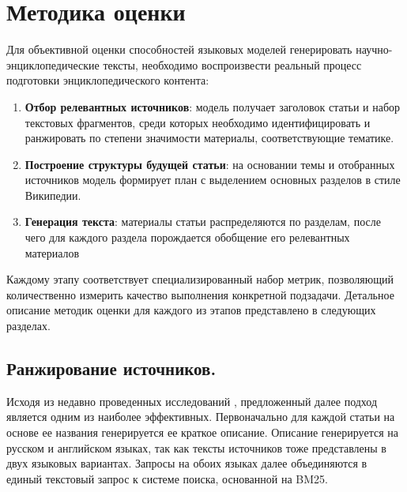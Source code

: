 \documentclass{article}
\theoremstyle{definition}
\theoremstyle{plain}
\begin{document}
\section*{Методика оценки}

Для объективной оценки способностей языковых моделей генерировать научно-энциклопедические тексты, необходимо воспроизвести реальный процесс подготовки энциклопедического контента:
\begin{enumerate}

    \item \textbf{Отбор релевантных источников}: модель получает заголовок статьи и набор текстовых фрагментов, среди которых необходимо идентифицировать и ранжировать по степени значимости материалы, соответствующие тематике. 
    
    \item \textbf{Построение структуры будущей статьи}: на основании темы и отобранных источников модель формирует план с выделением основных разделов в стиле Википедии.
    
    \item \textbf{Генерация текста}: материалы статьи распределяются по разделам, после чего для каждого раздела порождается обобщение его релевантных материалов

\end{enumerate}
Каждому этапу соответствует специализированный набор метрик, позволяющий количественно измерить качество выполнения конкретной подзадачи. 
Детальное описание методик оценки для каждого из этапов представлено в следующих разделах.
\subsection*{Ранжирование источников.}
Исходя из недавно проведенных исследований \cite{rerank}, предложенный далее подход является одним из наиболее эффективных.
Первоначально для каждой статьи на основе ее названия генерируется ее краткое описание. 
Описание генерируется на русском и английском языках, так как тексты источников тоже представлены в двух языковых вариантах. 
Запросы на обоих языках далее объединяются в единый текстовый запрос к системе поиска, основанной на BM25. 
\end{document}
